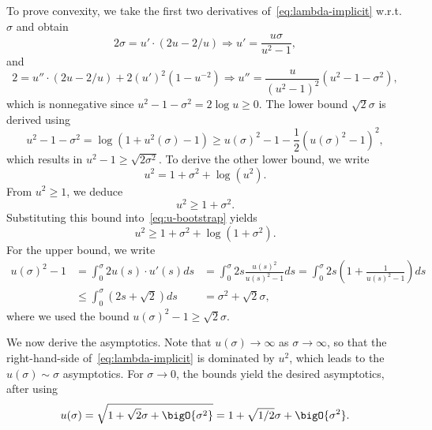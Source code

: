 \documentclass{article}
\begin{document}
\begin{appendixproof}
    To prove convexity, we take the first two derivatives of~\eqref{eq:lambda-implicit} w.r.t. $\sigma$ and obtain
    \[
    2\sigma=u'\cdot (2u-2/u)\Rightarrow u'=\frac{u\sigma}{u^2-1},
    \]
    and
    \[
    2=u''\cdot (2u-2/u)+2(u')^2(1-u^{-2})\Rightarrow u''=\frac{u}{(u^2-1)^2}\left(u^2-1-\sigma^2\right),
    \]
    which is nonnegative since $u^2-1-\sigma^2=2\log u\ge0.$ 
    The lower bound $\sqrt2\sigma$ is derived using
    \[
    u^2-1-\sigma^2=\log(1+u^2(\sigma)-1)\ge u(\sigma)^2-1-\frac12(u(\sigma)^2-1)^2,
    \]
    which results in $u^2-1\ge\sqrt{2\sigma^2}.$ To derive the other lower bound, we write
    \begin{equation}\label{eq:u-bootstrap}
    u^2=1+\sigma^2+\log(u^2).
  \end{equation}
    From $u^2\ge1$, we deduce
    \[
    u^2\ge 1+\sigma^2.
    \]
    Substituting this bound into~\eqref{eq:u-bootstrap} yields
    \[
    u^2\ge1+\sigma^2+\log(1+\sigma^2).
    \]
    For the upper bound, we write
    \begin{eqnarray*}
        u(\sigma)^2-1
        &=\int_0^\sigma 2u(s)\cdot u'(s)ds
        &=\int_0^\sigma 2s\frac{u(s)^2}{u(s)^2-1}ds
        =\int_0^\sigma 2s\left(1+\frac{1}{u(s)^2-1}\right)ds\\
        &\le\int_0^\sigma (2s+\sqrt2)ds
        &=\sigma^2+\sqrt2\sigma,
    \end{eqnarray*}
    where we used the bound $u(\sigma)^2-1\ge\sqrt2\sigma$.
    
    We now derive the asymptotics. Note that $u(\sigma)\to\infty$ as $\sigma\to\infty$, so that the right-hand-side of~\eqref{eq:lambda-implicit} is dominated by $u^2$, which leads to the $u(\sigma)\sim\sigma$ asymptotics. For $\sigma\to0$, the bounds yield the desired asymptotics, after using
    \[
    u(\sigma)=\sqrt{1+\sqrt{2}\sigma+\bigO{\sigma^2}}=1+\sqrt{1/2}\sigma+\bigO{\sigma^2}.
    \]
\end{appendixproof}
\end{document}
